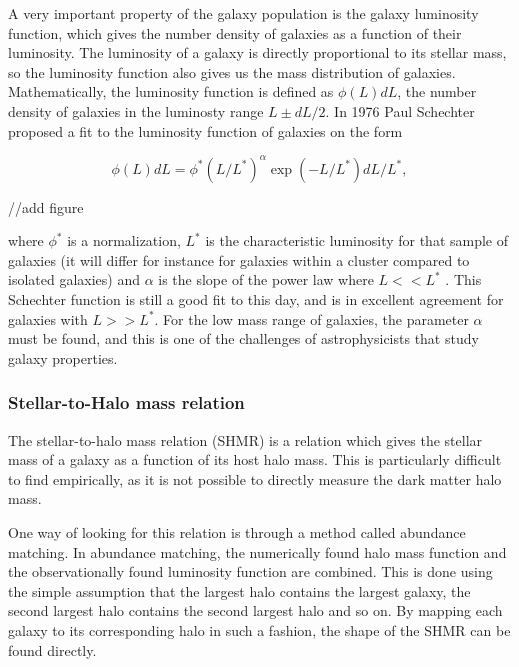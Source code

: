 A very important property of the galaxy population is the galaxy luminosity function, which gives the number density of galaxies as a function of their luminosity. The luminosity of a galaxy is directly proportional to its stellar mass, so the luminosity function also gives us the mass distribution of galaxies. Mathematically, the luminosity function is defined as $\phi(L)dL$, the number density of galaxies in the luminosty range $L \pm dL/2$. In 1976 Paul Schechter proposed a fit to the luminosity function of galaxies on the form

\begin{equation}
    \phi(L)dL = \phi^*(L/L^*)^{\alpha}\exp{(-L/L^*)}dL/L^*,
\end{equation}

//add figure

where $\phi^*$ is a normalization, $L^*$ is the characteristic luminosity for that sample of galaxies (it will differ for instance for galaxies within a cluster compared to isolated galaxies) and $\alpha$ is the slope of the power law where $L<<L^*$ \parencite{Schechter1976}. This Schechter function is still a good fit to this day, and is in excellent agreement for galaxies with $L>>L^*$. For the low mass range of galaxies, the parameter $\alpha$ must be found, and this is one of the challenges of astrophysicists that study galaxy properties.


\subsubsection{Stellar-to-Halo mass relation}

The stellar-to-halo mass relation (SHMR) is a relation which gives the stellar mass of a galaxy as a function of its host halo mass. This is particularly difficult to find empirically, as it is not possible to directly measure the dark matter halo mass. 

One way of looking for this relation is through a method called abundance matching. In abundance matching, the numerically found halo mass function and the observationally found luminosity function are combined. This is done using the simple assumption that the largest halo contains the largest galaxy, the second largest halo contains the second largest halo and so on. By mapping each galaxy to its corresponding halo in such a fashion, the shape of the SHMR can be found directly.


